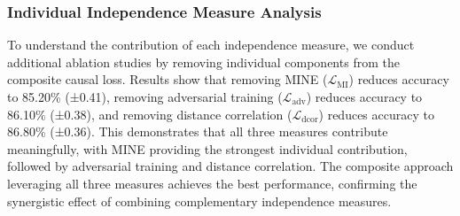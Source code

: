 \documentclass[journal]{IEEEtran}
\begin{document}
\subsubsection{Individual Independence Measure Analysis}
To understand the contribution of each independence measure, we conduct additional ablation studies by removing individual components from the composite causal loss. Results show that removing MINE ($\mathcal{L}_{\text{MI}}$) reduces accuracy to 85.20\% (±0.41), removing adversarial training ($\mathcal{L}_{\text{adv}}$) reduces accuracy to 86.10\% (±0.38), and removing distance correlation ($\mathcal{L}_{\text{dcor}}$) reduces accuracy to 86.80\% (±0.36). This demonstrates that all three measures contribute meaningfully, with MINE providing the strongest individual contribution, followed by adversarial training and distance correlation. The composite approach leveraging all three measures achieves the best performance, confirming the synergistic effect of combining complementary independence measures.
\end{document}
